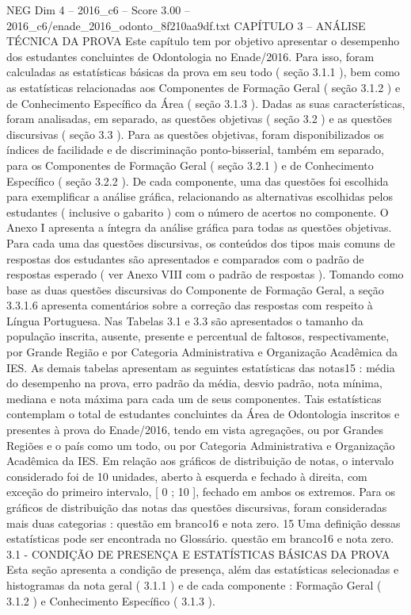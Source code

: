 \begin{textsample}{NEG Dim 4 – 2016\_c6 – Score 3.00 – 2016\_c6/enade\_2016\_odonto\_8f210aa9df.txt}  \label{ex:f4_neg_299}
CAPÍTULO 3 – ANÁLISE TÉCNICA DA PROVA Este capítulo tem por objetivo apresentar o desempenho dos estudantes concluintes de Odontologia no Enade/2016.
Para isso, foram calculadas as estatísticas básicas da prova em seu todo ( seção 3.1.1 ), bem como as estatísticas relacionadas aos Componentes de Formação Geral ( seção 3.1.2 ) e de Conhecimento Específico da Área ( seção 3.1.3 ).
Dadas as suas características, foram analisadas, em separado, as questões objetivas ( seção 3.2 ) e as questões discursivas ( seção 3.3 ).
Para as questões objetivas, foram disponibilizados os índices de facilidade e de discriminação ponto-bisserial, também em separado, para os Componentes de Formação Geral ( seção 3.2.1 ) e de Conhecimento Específico ( seção 3.2.2 ).
De cada componente, uma das questões foi escolhida para exemplificar a análise gráfica, relacionando as alternativas escolhidas pelos estudantes ( inclusive o gabarito ) com o número de acertos no componente.
O Anexo I apresenta a íntegra da análise gráfica para todas as questões objetivas.
Para cada uma das questões discursivas, os conteúdos dos tipos mais comuns de respostas dos estudantes são apresentados e comparados com o padrão de respostas esperado ( ver Anexo VIII com o padrão de respostas ).
Tomando como base as duas questões discursivas do Componente de Formação Geral, a seção 3.3.1.6 apresenta comentários sobre a correção das respostas com respeito à Língua Portuguesa.
Nas Tabelas 3.1 e 3.3 são apresentados o tamanho da população inscrita, ausente, presente e percentual de faltosos, respectivamente, por Grande Região e por Categoria Administrativa e Organização Acadêmica da IES.
As demais tabelas apresentam as seguintes estatísticas das notas15 : média do desempenho na prova, erro padrão da média, desvio padrão, nota mínima, mediana e nota máxima para cada um de seus componentes.
Tais estatísticas contemplam o total de estudantes concluintes da Área de Odontologia inscritos e presentes à prova do Enade/2016, tendo em vista agregações, ou por Grandes Regiões e o país como um todo, ou por Categoria Administrativa e Organização Acadêmica da IES.
Em relação aos gráficos de distribuição de notas, o intervalo considerado foi de 10 unidades, aberto à esquerda e fechado à direita, com exceção do primeiro intervalo, [ 0 ; 10 ], fechado em ambos os extremos.
Para os gráficos de distribuição das notas das questões discursivas, foram consideradas mais duas categorias : questão em branco16 e nota zero. 15 Uma definição dessas estatísticas pode ser encontrada no Glossário. questão em branco16 e nota zero. 3.1 - CONDIÇÃO DE PRESENÇA E ESTATÍSTICAS BÁSICAS DA PROVA Esta seção apresenta a condição de presença, além das estatísticas selecionadas e histogramas da nota geral ( 3.1.1 ) e de cada componente : Formação Geral ( 3.1.2 ) e Conhecimento Específico ( 3.1.3 ).

\end{textsample}
